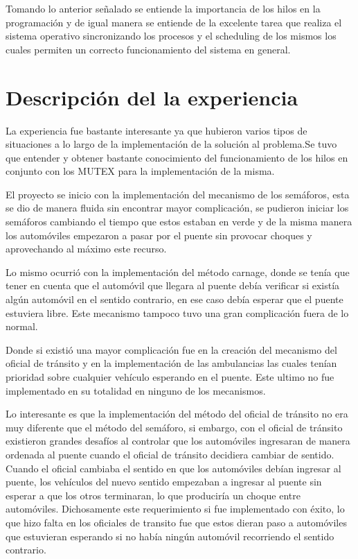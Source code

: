 \documentclass[16pt,a4papper]{article}
\begin{document}
	Tomando lo anterior señalado se entiende la importancia de los hilos en la programación y de igual manera se entiende de la excelente tarea que realiza el sistema operativo sincronizando los procesos y el scheduling de los mismos los cuales permiten un correcto funcionamiento del sistema en general.
	
	\newpage
	\section{Descripción del la experiencia}
	La experiencia fue bastante interesante ya que hubieron varios tipos de situaciones a lo largo de la implementación de la solución al problema.Se tuvo que entender y obtener bastante conocimiento  del funcionamiento de los hilos en conjunto con los MUTEX para la implementación de la misma.\par  
	
	El proyecto se inicio con la implementación del mecanismo de los semáforos, esta se dio de manera fluida sin encontrar mayor complicación, se pudieron iniciar los semáforos cambiando el tiempo que estos estaban en verde y de la misma manera los automóviles empezaron a pasar por el puente sin provocar choques y aprovechando al máximo este recurso. \par
	
	Lo mismo ocurrió con la implementación del método carnage, donde se tenía que tener en cuenta que el automóvil que llegara al puente debía verificar si existía algún automóvil en el sentido contrario, en ese caso debía esperar que el puente estuviera libre. Este mecanismo tampoco tuvo una gran complicación fuera de lo normal.\par
	
	Donde si existió una mayor complicación fue en la creación del mecanismo del oficial de tránsito y en la implementación de las ambulancias las cuales tenían prioridad sobre cualquier vehículo esperando en el puente. Este  ultimo no fue implementado en su totalidad en ninguno de los mecanismos.\par 
	
	Lo interesante es que la implementación del método del oficial de tránsito no era muy diferente que el método del semáforo, si embargo, con el oficial de tránsito existieron grandes desafíos al controlar que los automóviles ingresaran de manera ordenada al puente cuando el oficial de tránsito decidiera cambiar de sentido. Cuando el oficial cambiaba el sentido en que los automóviles debían ingresar al puente, los vehículos del nuevo sentido empezaban a ingresar al puente sin esperar a que los otros terminaran, lo que produciría un choque entre automóviles. Dichosamente este requerimiento si fue implementado con éxito, lo que hizo falta en los oficiales de transito fue que estos dieran paso a automóviles que estuvieran esperando si no había ningún automóvil recorriendo el sentido contrario.\par 
	
\end{document}
